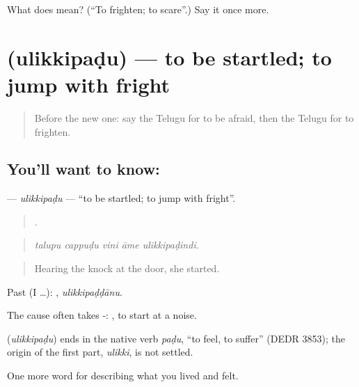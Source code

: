 \begin{tcolorbox}[breakable,colback=teal!4,colframe=teal!35!black,title={Before you move on}]
What does  mean? (\textquotedblleft{}To frighten; to scare\textquotedblright{}.) Say it once more.
\end{tcolorbox}
\section[\texorpdfstring{\te{ఉలిక్కిపడు} (ulikkipaḍu)}{ఉలిక్కిపడు (ulikkipaḍu)}]{ (ulikkipaḍu) — to be startled; to jump with fright}

\label{lesson:TE-C495-ulikkipadu}



\begin{quote}
Before the new one: say the Telugu for to be afraid, then the Telugu for to frighten.
\end{quote}

\subsection*{You'll want to know: }
\textbf{} — \emph{ulikkipaḍu} — \textquotedblleft{}to be startled; to jump with fright\textquotedblright{}.

\begin{quote}
    .
\end{quote}

\begin{quote}
\emph{talupu cappuḍu vini āme ulikkipaḍindi.}
\end{quote}

\begin{quote}
Hearing the knock at the door, she started.
\end{quote}

Past (I …): , \emph{ulikkipaḍḍānu}.

The cause often takes -:  , to start at a noise.

\begin{cousinweb}
\textbf{} (\emph{ulikkipaḍu}) ends in the native verb \emph{paḍu}, \textquotedblleft{}to feel, to suffer\textquotedblright{} (DEDR 3853); the origin of the first part, \emph{ulikki}, is not settled.
\end{cousinweb}

\begin{grammarlens}[title={What you've built}]
One more word for describing what you lived and felt.
\end{grammarlens}

